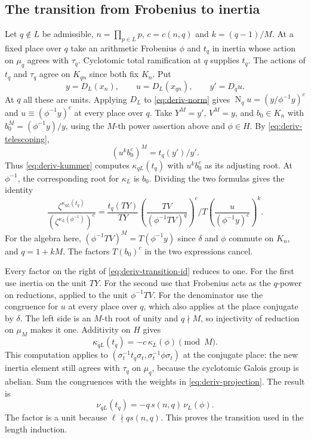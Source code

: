 \subsection{The transition from Frobenius to inertia}

Let \(q\notin L\) be admissible, \(n=\prod_{p\in L}p\),
\(c=c(n,q)\) and \(k=(q-1)/M\). At a fixed place over \(q\) take
an arithmetic Frobenius \(\phi\) and \(t_q\) in inertia whose action
on \(\mu_q\) agrees with \(\tau_q\). Cyclotomic total ramification
at \(q\) supplies \(t_q\). The actions of \(t_q\) and \(\tau_q\)
agree on \(K_{qn}\) since both fix \(K_n\). Put
\[
       y=D_L(x_n),\qquad u=D_L(x_{qn}),\qquad y'=D_q u .
\]
At \(q\) all these are units. Applying \(D_L\) to \eqref{eq:deriv-norm} gives
\(\operatorname N_q u=(y/\phi^{-1}y)^c\) and
\(u\equiv(\phi^{-1}y)^c\) at every place over \(q\).
Take \(Y^M=y'\), \(V^M=y\), and
\(b_0\in K_n\) with \(b_0^M=(\phi^{-1}y)/y\), using the
\(M\)-th power assertion above and \(\phi\in H\).
By \eqref{eq:deriv-telescoping},
\[
       (u^k b_0^c)^M=t_q(y')/y'.
\]
Thus \eqref{eq:deriv-kummer} computes \(\kappa_{qL}(t_q)\) with \(u^k b_0^c\) as its
adjusting root. At \(\phi^{-1}\), the corresponding root for
\(\kappa_L\) is \(b_0\). Dividing the two formulas gives the identity
\begin{equation}
 \frac{\zeta^{\kappa_{qL}(t_q)}}{(\zeta^{\kappa_L(\phi^{-1})})^c}
  =\frac{t_q(TY)}{TY}
     \left(\frac{TV}{(\phi^{-1}TV)^q}\right)^c
      \bigg/ T\!\left(\frac{u}{(\phi^{-1}y)^c}\right)^k .
 \label{eq:deriv-transition-id}
\end{equation}
For the algebra here, \((\phi^{-1}TV)^M=T(\phi^{-1}y)\) since
\(\delta\) and \(\phi\) commute on \(K_n\), and \(q=1+kM\).
The factors \(T(b_0)^c\) in the two expressions cancel.

Every factor on the right of \eqref{eq:deriv-transition-id} reduces to one. For the first use
inertia on the unit \(TY\). For the second use that Frobenius acts
as the \(q\)-power on reductions, applied to the unit
\(\phi^{-1}TV\). For the denominator use the congruence for \(u\)
at every place over \(q\), which also applies at the place conjugate
by \(\delta\). The left side is an \(M\)-th root of unity and \(q\nmid
M\), so injectivity of reduction on \(\mu_M\) makes it one.
Additivity on \(H\) gives
\[
            \kappa_{qL}(t_q)=-c\,\kappa_L(\phi)\pmod M .
\]
This computation applies to
\((\sigma_t^{-1}t_q\sigma_t,\sigma_t^{-1}\phi\sigma_t)\) at the
conjugate place: the new inertia element still agrees with
\(\tau_q\) on \(\mu_q\), because the cyclotomic Galois group is
abelian. Sum the congruences with the weights in \eqref{eq:deriv-projection}. The result is
\begin{equation}
                 \nu_{qL}(t_q)=-q\,s(n,q)\,\nu_L(\phi).
 \label{eq:deriv-transition}
\end{equation}
The factor is a unit because \(\ell\nmid q s(n,q)\). This proves
the transition used in the length induction.

